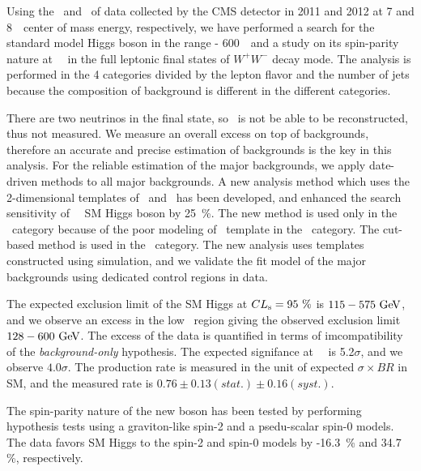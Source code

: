 Using the \intlumiSevenTeV\ and \intlumiEightTeV\ of data collected by the CMS detector 
in 2011 and 2012 at 7 and 8~\TeV\ center of mass energy, respectively, we have performed 
a search for the standard model Higgs boson in the range  - 600~\GeV\ 
and a study on its spin-parity nature at ~\GeV\ 
in the full leptonic final states of $W^+W^-$ decay mode. 
The analysis is performed in the 4 categories divided by the lepton flavor and the 
number of jets because the composition of background is different
in the different categories. 

There are two neutrinos in the final state, so \mHi\ is not be able to be reconstructed, 
thus not measured. We measure an overall excess on top of backgrounds, 
therefore an accurate and precise 
estimation of backgrounds is the key in this analysis. For the reliable estimation 
of the major backgrounds, we apply date-driven methods to all major backgrounds. 
%
A new analysis method which uses the 2-dimensional templates of \mT\ and \mll\ has been developed,
and enhanced the search sensitivity of ~\GeV\ SM Higgs boson by 25~\%. 
The new method is used only in the \DF\ category because of the poor modeling of \dyll\
template in the \SF\ category. The cut-based method is used in the \SF\ category.
%
The new analysis uses templates constructed using simulation, and we 
validate the fit model of the major backgrounds using dedicated control 
regions in data. 

The expected exclusion limit of the SM Higgs at $CL_\mathrm{s}=95~\%$ is $115-575~\mathrm{Ge\kern -0.1em V}$, 
and we observe an excess in the low \mHi\ region giving the observed exclusion 
limit $128-600~\mathrm{Ge\kern -0.1em V}$. 
The excess of the data is quantified in terms of imcompatibility of the 
\textit{background-only} hypothesis. The expected signifance at \mHi=125~\GeV\ 
is 5.2$\sigma$, and we observe $4.0\sigma$.
The production rate is measured in the unit of expected $\sigma \times BR$ in SM, 
and the measured rate is $0.76 \pm 0.13(stat.) \pm 0.16(syst.)$.  

The spin-parity nature of the new boson has been tested by performing hypothesis 
tests using a graviton-like spin-2 and a psedu-scalar spin-0 models. The data 
favors SM Higgs to the spin-2 and spin-0 models by \CLs=0.2-16.3~\% and 34.7 \%, 
respectively.
\\

